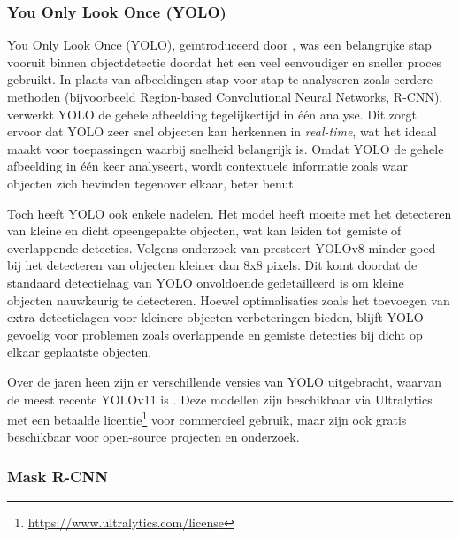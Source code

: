 \subsubsection{You Only Look Once (YOLO)}

You Only Look Once (YOLO), geïntroduceerd door \textcite{Redmon2016}, was een belangrijke stap vooruit binnen objectdetectie doordat het een veel eenvoudiger en sneller proces gebruikt. 
In plaats van afbeeldingen stap voor stap te analyseren zoals eerdere methoden (bijvoorbeeld Region-based Convolutional Neural Networks, R-CNN), verwerkt YOLO de gehele afbeelding tegelijkertijd in één analyse. 
Dit zorgt ervoor dat YOLO zeer snel objecten kan herkennen in \textit{real-time}, wat het ideaal maakt voor toepassingen waarbij snelheid belangrijk is.
Omdat YOLO de gehele afbeelding in één keer analyseert, wordt contextuele informatie zoals waar objecten zich bevinden tegenover elkaar, beter benut.
\newline \par
Toch heeft YOLO ook enkele nadelen. Het model heeft moeite met het detecteren van kleine en dicht opeengepakte objecten, wat kan leiden tot gemiste of overlappende detecties. 
Volgens onderzoek van \textcite{Huang2024} presteert YOLOv8 minder goed bij het detecteren van objecten kleiner dan 8x8 pixels. 
Dit komt doordat de standaard detectielaag van YOLO onvoldoende gedetailleerd is om kleine objecten nauwkeurig te detecteren. 
Hoewel optimalisaties zoals het toevoegen van extra detectielagen voor kleinere objecten verbeteringen bieden, blijft YOLO gevoelig voor problemen zoals overlappende en gemiste detecties bij dicht op elkaar geplaatste objecten.
\newline \par
Over de jaren heen zijn er verschillende versies van YOLO uitgebracht, waarvan de meest recente YOLOv11 is \autocite{Khanam2024}.
Deze modellen zijn beschikbaar via Ultralytics met een betaalde licentie\footnote{\url{https://www.ultralytics.com/license}} voor commercieel gebruik, maar zijn ook gratis beschikbaar voor open-source projecten en onderzoek.

\subsubsection{Mask R-CNN}

